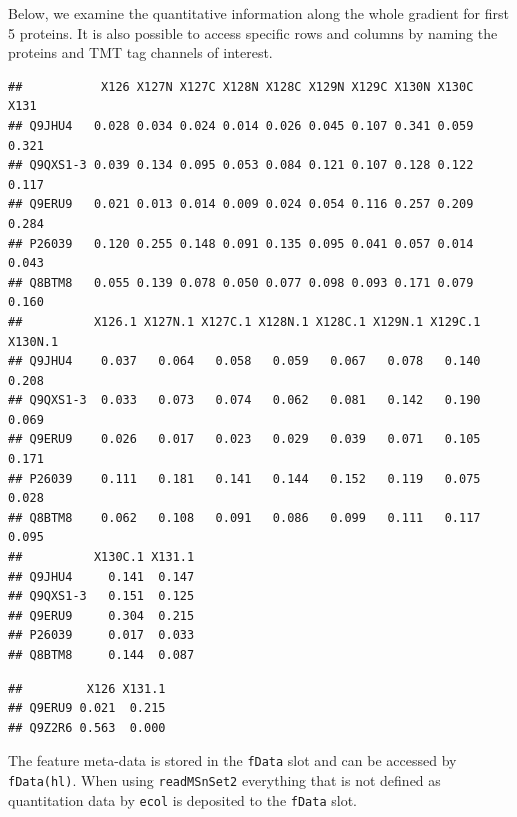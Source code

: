 Below, we examine the quantitative information along the whole
gradient for first 5 proteins.  It is also possible to access specific
rows and columns by naming the proteins and TMT tag channels of
interest.

\begin{knitrout}
\color{fgcolor}\begin{kframe}
\begin{alltt}
\hlstd{(hl)[}\hlopt{:}\hlstd{, ]}
\end{alltt}
\begin{verbatim}
##           X126 X127N X127C X128N X128C X129N X129C X130N X130C  X131
## Q9JHU4   0.028 0.034 0.024 0.014 0.026 0.045 0.107 0.341 0.059 0.321
## Q9QXS1-3 0.039 0.134 0.095 0.053 0.084 0.121 0.107 0.128 0.122 0.117
## Q9ERU9   0.021 0.013 0.014 0.009 0.024 0.054 0.116 0.257 0.209 0.284
## P26039   0.120 0.255 0.148 0.091 0.135 0.095 0.041 0.057 0.014 0.043
## Q8BTM8   0.055 0.139 0.078 0.050 0.077 0.098 0.093 0.171 0.079 0.160
##          X126.1 X127N.1 X127C.1 X128N.1 X128C.1 X129N.1 X129C.1 X130N.1
## Q9JHU4    0.037   0.064   0.058   0.059   0.067   0.078   0.140   0.208
## Q9QXS1-3  0.033   0.073   0.074   0.062   0.081   0.142   0.190   0.069
## Q9ERU9    0.026   0.017   0.023   0.029   0.039   0.071   0.105   0.171
## P26039    0.111   0.181   0.141   0.144   0.152   0.119   0.075   0.028
## Q8BTM8    0.062   0.108   0.091   0.086   0.099   0.111   0.117   0.095
##          X130C.1 X131.1
## Q9JHU4     0.141  0.147
## Q9QXS1-3   0.151  0.125
## Q9ERU9     0.304  0.215
## P26039     0.017  0.033
## Q8BTM8     0.144  0.087
\end{verbatim}
\begin{alltt}
\hlstd{(hl)[}\hlstd{(}\hlstd{,} \hlstd{),} \hlstd{(}\hlstd{,} \hlstd{)]}
\end{alltt}
\begin{verbatim}
##         X126 X131.1
## Q9ERU9 0.021  0.215
## Q9Z2R6 0.563  0.000
\end{verbatim}
\end{kframe}
\end{knitrout}

The feature meta-data is stored in the \texttt{fData} slot and can be
accessed by \texttt{fData(hl)}. When using \texttt{readMSnSet2}
everything that is not defined as quantitation data by \texttt{ecol}
is deposited to the \texttt{fData} slot.

